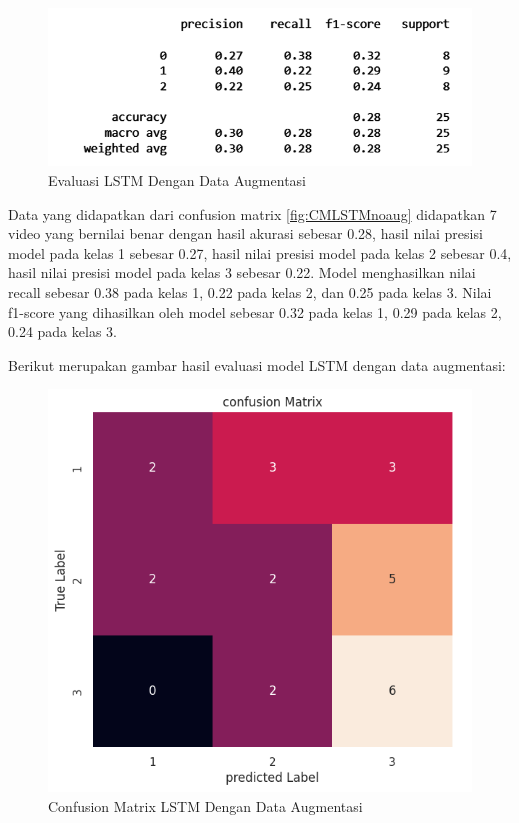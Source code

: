 \begin{figure} [ht] \centering
  \includegraphics[scale=0.55]{gambar/scoreLSTMnoaug.png}
  \caption{Evaluasi LSTM Dengan Data Augmentasi}
  \label{fig:ScoreLSTMnoaug}
\end{figure}
Data yang didapatkan dari confusion matrix \ref{fig:CMLSTMnoaug} didapatkan 7 video yang bernilai benar
dengan hasil akurasi sebesar 0.28, hasil nilai presisi model pada kelas 1 sebesar 0.27, hasil nilai
presisi model pada kelas 2 sebesar 0.4, hasil nilai presisi model pada kelas 3 sebesar 0.22. Model menghasilkan
nilai recall sebesar 0.38 pada kelas 1, 0.22 pada kelas 2, dan 0.25 pada kelas 3. Nilai f1-score yang dihasilkan
oleh model sebesar 0.32 pada kelas 1, 0.29 pada kelas 2, 0.24 pada kelas 3.

Berikut merupakan gambar hasil evaluasi model LSTM dengan data augmentasi:
\newpage
\begin{figure} [ht] \centering
  \includegraphics[scale=0.7]{gambar/CMLSTMaug.png}
  \caption{Confusion Matrix LSTM Dengan Data Augmentasi}
  \label{fig:CMLSTMaug}
\end{figure}

